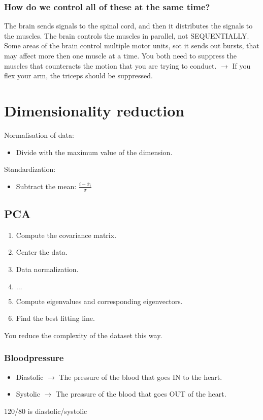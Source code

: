 \documentclass[a4paper]{article}
\begin{document}
\subsubsection{How do we control all of these at the same time?}
The brain sends signals to the spinal cord, and then it distributes the signals to the muscles. The brain controls the muscles in parallel, not SEQUENTIALLY. Some areas of the brain control multiple motor units, sot it sends out bursts, that may affect more then one muscle at a time. You both need to suppress the muscles that counteracts the motion that you are trying to conduct. $ \rightarrow $  If you flex your arm, the triceps should be suppressed. 


\section{Dimensionality reduction}
Normalisation of data: 
\begin{itemize}
	\item Divide with the maximum value of the dimension.
\end{itemize}
Standardization:
\begin{itemize}
	\item Subtract the mean: $ \frac{i - \overline{x}_i}{\sigma} $
\end{itemize}

\subsection{PCA}
\begin{enumerate}
	\item Compute the covariance matrix.
	\item Center the data.
	\item Data normalization.
	\item $ \hdots $
	\item Compute eigenvalues and corresponding eigenvectors.
	\item Find the best fitting line.
\end{enumerate}

You reduce the complexity of the dataset this way.

\subsubsection{Bloodpressure}
\begin{itemize}
	\item Diastolic $ \rightarrow $ The pressure of the blood that goes IN to the heart.
	\item Systolic $ \rightarrow $ The pressure of the blood that goes OUT of the heart.
\end{itemize}
120/80 is diastolic/systolic
\end{document}
